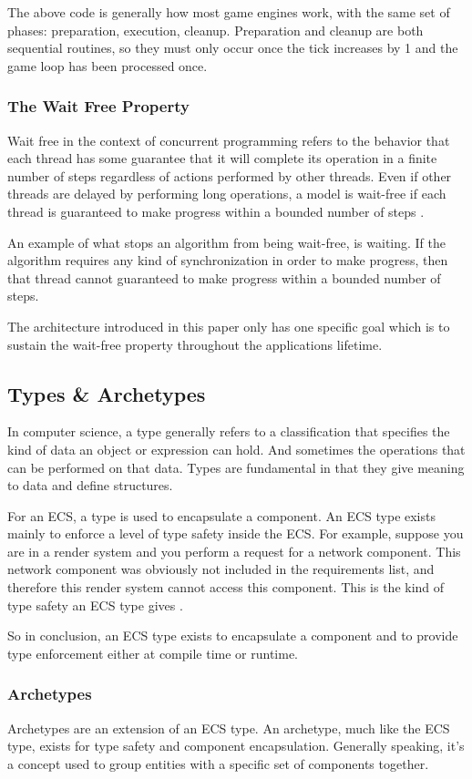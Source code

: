 The above code is generally how most game engines work, with the same set of phases: preparation, execution, cleanup. Preparation and cleanup are both sequential routines, so they must only occur once the tick increases by 1 and the game loop has been processed once.

\subsubsection{The Wait Free Property}
Wait free in the context of concurrent programming refers to the behavior that each thread has some guarantee that it will complete its operation in a finite number of steps regardless of actions performed by other threads. Even if other threads are delayed by performing long operations, a model is wait-free if each thread is guaranteed to make progress within a bounded number of steps \cite{Herlihy_2021b}.

An example of what stops an algorithm from being wait-free, is waiting. If the algorithm requires any kind of synchronization in order to make progress, then that thread cannot guaranteed to make progress within a bounded number of steps.

The architecture introduced in this paper only has one specific goal which is to sustain the wait-free property throughout the applications lifetime.

\subsection{Types \& Archetypes}
In computer science, a type generally refers to a classification that specifies the kind of data an object or expression can hold. And sometimes the operations that can be performed on that data. Types are fundamental in that they give meaning to data and define structures. 

For an ECS, a type is used to encapsulate a component. An ECS type exists mainly to enforce a level of type safety inside the ECS. For example, suppose you are in a render system and you perform a request for a network component. This network component was obviously not included in the requirements list, and therefore this render system cannot access this component. This is the kind of type safety an ECS type gives \cite{SanderMertensECS}.

So in conclusion, an ECS type exists to encapsulate a component and to provide type enforcement either at compile time or runtime.

\subsubsection{Archetypes}
Archetypes are an extension of an ECS type. An archetype, much like the ECS type, exists for type safety and component encapsulation. Generally speaking, it's a concept used to group entities with a specific set of components together.

